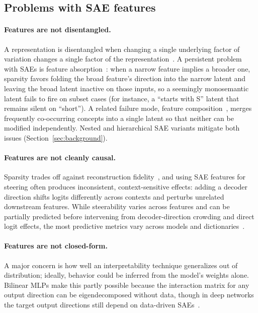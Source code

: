 \subsection{Problems with SAE features}

\paragraph{Features are not disentangled.}
A representation is disentangled when changing a single underlying factor
of variation changes a single factor of the
representation~\cite{locatello2019}. A persistent problem with SAEs is
feature absorption~\cite{chanin2025}: when a narrow feature implies a
broader one, sparsity favors folding the broad feature's direction into
the narrow latent and leaving the broad latent inactive on those inputs,
so a seemingly monosemantic latent fails to fire on subset cases (for
instance, a ``starts with S'' latent that remains silent on ``short''). A
related failure mode, feature composition~\cite{bussmann2025}, merges
frequently co-occurring concepts into a single latent so that neither can
be modified independently. Nested and hierarchical SAE variants mitigate
both issues (Section~\ref{sec:background}).

\paragraph{Features are not cleanly causal.}
Sparsity trades off against reconstruction fidelity~\cite{gao2024}, and
using SAE features for steering often produces inconsistent,
context-sensitive effects: adding a decoder direction shifts logits
differently across contexts and perturbs unrelated downstream features.
While steerability varies across features and can be partially predicted
before intervening from decoder-direction crowding and direct logit
effects, the most predictive metrics vary across models and
dictionaries~\cite{duan2026}.

\paragraph{Features are not closed-form.}
A major concern is how well an interpretability technique generalizes out
of distribution; ideally, behavior could be inferred from the model's
weights alone. Bilinear MLPs make this partly possible because the
interaction matrix for any output direction can be eigendecomposed
without data, though in deep networks the target output directions still
depend on data-driven SAEs~\cite{pearce2025}.


